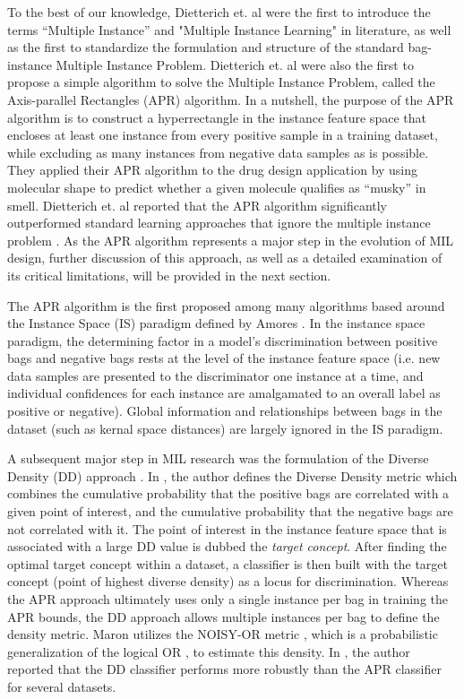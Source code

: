 \documentclass[12pt,dvips]{report}
\numberwithin{equation}{section}
\begin{document}
To the best of our knowledge, Dietterich et. al \cite{diet97} were the first to introduce the terms ``Multiple Instance'' and "Multiple Instance Learning"  in literature, as well as the first to standardize the formulation and structure of the standard bag-instance Multiple Instance Problem. Dietterich et. al were also the first to propose a simple algorithm to solve the Multiple Instance Problem, called the Axis-parallel Rectangles (APR) algorithm. In a nutshell, the purpose of the APR algorithm is to construct a hyperrectangle in the instance feature space that encloses at least one instance from every positive sample in a training dataset, while excluding as many instances from negative data samples as is possible. They applied their APR algorithm to the drug design application by using molecular shape to predict whether a given molecule qualifies as ``musky'' in smell. Dietterich et. al reported that the APR algorithm significantly outperformed standard learning approaches that ignore the multiple instance problem \cite{diet97}. As the APR algorithm represents a major step in the evolution of MIL design, further discussion of this approach, as well as a detailed examination of its critical limitations, will be provided in the next section.

The APR algorithm is the first proposed among many algorithms based around the Instance Space (IS) paradigm defined by Amores \cite{amor13}. In the instance space paradigm, the determining factor in a model's discrimination between positive bags and negative bags rests at the level of the instance feature space (i.e. new data samples are presented
to the discriminator one instance at a time, and individual confidences for each instance are amalgamated to an overall label as positive or negative). Global information and relationships between bags in the dataset (such as kernal space distances) are largely ignored in the IS paradigm.  

A subsequent major step in MIL research was the formulation of the Diverse Density (DD) approach \cite{maro98}. In \cite{maro98}, the author defines the Diverse Density metric which combines the cumulative probability that the positive bags are correlated with a given point of interest, and the cumulative probability that the negative bags are not correlated with it.  The point of interest in the instance feature space that is associated with a large DD value is dubbed the \emph{target concept}. After finding the optimal target concept within a dataset, a classifier is then built with the target concept (point of highest diverse density) as a locus for discrimination. Whereas the APR approach ultimately uses only a single instance per bag in training the APR bounds, the DD approach allows multiple instances per bag to define the density metric. Maron utilizes the NOISY-OR metric \cite{maro98}, which is a probabilistic generalization of the logical OR \cite{srin93}, to estimate this density. In \cite{maro98}, the author reported that the DD classifier performs more robustly than the APR classifier for several datasets.  
\end{document}
